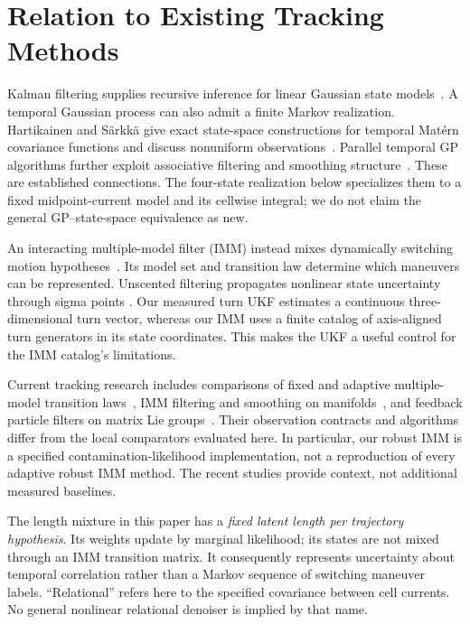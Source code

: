\documentclass[journal]{IEEEtran}
\begin{document}
\section{Relation to Existing Tracking Methods}

Kalman filtering supplies recursive inference for linear Gaussian state
models~\cite{kalman1960}. A temporal Gaussian process can also admit a
finite Markov realization. Hartikainen and S\"arkk\"a give exact
state-space constructions for temporal Mat\'ern covariance functions and
discuss nonuniform observations~\cite{hartikainen2010}. Parallel temporal
GP algorithms further exploit associative filtering and smoothing
structure~\cite{corenflos2021}. These are established connections. The
four-state realization below specializes them to a fixed midpoint-current
model and its cellwise integral; we do not claim the general
GP--state-space equivalence as new.

An interacting multiple-model filter (IMM) instead mixes dynamically
switching motion hypotheses~\cite{blom1988}. Its model set and transition
law determine which maneuvers can be represented. Unscented filtering
propagates nonlinear state uncertainty through sigma points
\cite{julier2004}. Our measured turn UKF estimates a continuous
three-dimensional turn vector, whereas our IMM uses a finite catalog of
axis-aligned turn generators in its state coordinates. This makes the
UKF a useful control for the IMM catalog's limitations.

Current tracking research includes comparisons of fixed and adaptive
multiple-model transition laws~\cite{lizzio2026}, IMM filtering and
smoothing on manifolds~\cite{koller2021}, and feedback particle filters on
matrix Lie groups~\cite{zhang2017}. Their observation contracts and
algorithms differ from the local comparators evaluated here. In
particular, our robust IMM is a specified contamination-likelihood
implementation, not a reproduction of every adaptive robust IMM method.
The recent studies provide context, not additional measured baselines.

The length mixture in this paper has a \emph{fixed latent length per
trajectory hypothesis}. Its weights update by marginal likelihood; its
states are not mixed through an IMM transition matrix. It consequently
represents uncertainty about temporal correlation rather than a Markov
sequence of switching maneuver labels. ``Relational'' refers here to the
specified covariance between cell currents. No general nonlinear
relational denoiser is implied by that name.
\end{document}
